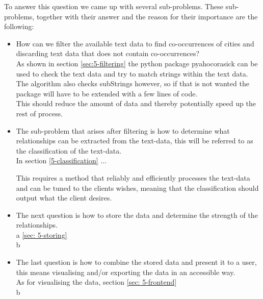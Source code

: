To answer this question we came up with several sub-problems. These sub-problems, together with their answer and the reason for their importance are the following:
\begin{itemize}
    \item How can we filter the available text data to find co-occurrences of cities and discarding text data that does not contain co-occurrences? \\
    
    As shown in section \ref{sec:5-filtering} the python package pyahocorasick can be used to check the text data and try to match strings within the text data. The algorithm also checks subStrings however, so if that is not wanted the package will have to be extended with a few lines of code. \\
    
    This should reduce the amount of data and thereby potentially speed up the rest of process.
    
    \item The sub-problem that arises after filtering is how to determine what relationships can be extracted from the text-data, this will be referred to as the classification of the text-data. \\
    
    In section \ref{5-classification} ... \todo{}
    
    This requires a method that reliably and efficiently processes the text-data and can be tuned to the clients wishes, meaning that the classification should output what the client desires. 
    
    \item The next question is how to store the data and determine the strength of the relationships. \\
    
    a \ref{sec: 5-storing}\\
    
    b
    
    \item The last question is how to combine the stored data and present it to a user, this means visualising and/or exporting the data in an accessible way.\\
    
    As for visualising the data, section \ref{sec: 5-frontend} 
    \\
    
    b
\end{itemize}

